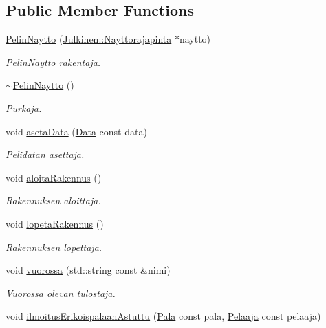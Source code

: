 \subsection*{Public Member Functions}
\begin{DoxyCompactItemize}
\item 
\hyperlink{class_pelin_naytto_a69dd5937c265b77376e79368a066dd99}{Pelin\+Naytto} (\hyperlink{class_julkinen_1_1_nayttorajapinta}{Julkinen\+::\+Nayttorajapinta} $\ast$naytto)
\begin{DoxyCompactList}\small\item\em \hyperlink{class_pelin_naytto}{Pelin\+Naytto} rakentaja. \end{DoxyCompactList}\item 
\hyperlink{class_pelin_naytto_a9d8dbd0f5e10e826d97cee98fd47247d}{$\sim$\+Pelin\+Naytto} ()
\begin{DoxyCompactList}\small\item\em Purkaja. \end{DoxyCompactList}\item 
void \hyperlink{class_pelin_naytto_a2f155f89cfe6200a727fd45c8aead8c9}{aseta\+Data} (\hyperlink{class_data}{Data} const data)
\begin{DoxyCompactList}\small\item\em Pelidatan asettaja. \end{DoxyCompactList}\item 
void \hyperlink{class_pelin_naytto_a97b89437cac4b6d4edcdb8eb7fe59be4}{aloita\+Rakennus} ()
\begin{DoxyCompactList}\small\item\em Rakennuksen aloittaja. \end{DoxyCompactList}\item 
void \hyperlink{class_pelin_naytto_a2c925cc22e2a633889a8bcebd40e9708}{lopeta\+Rakennus} ()
\begin{DoxyCompactList}\small\item\em Rakennuksen lopettaja. \end{DoxyCompactList}\item 
void \hyperlink{class_pelin_naytto_adc943c511334eb5be52dc93e4eccb52c}{vuorossa} (std\+::string const \&nimi)
\begin{DoxyCompactList}\small\item\em Vuorossa olevan tulostaja. \end{DoxyCompactList}\item 
void \hyperlink{class_pelin_naytto_a06f0e63f3e8bfe7010f4a2f599e8b3b6}{ilmoitus\+Erikoispalaan\+Astuttu} (\hyperlink{class_pala}{Pala} const pala, \hyperlink{class_pelaaja}{Pelaaja} const pelaaja)

\end{DoxyCompactItemize}
